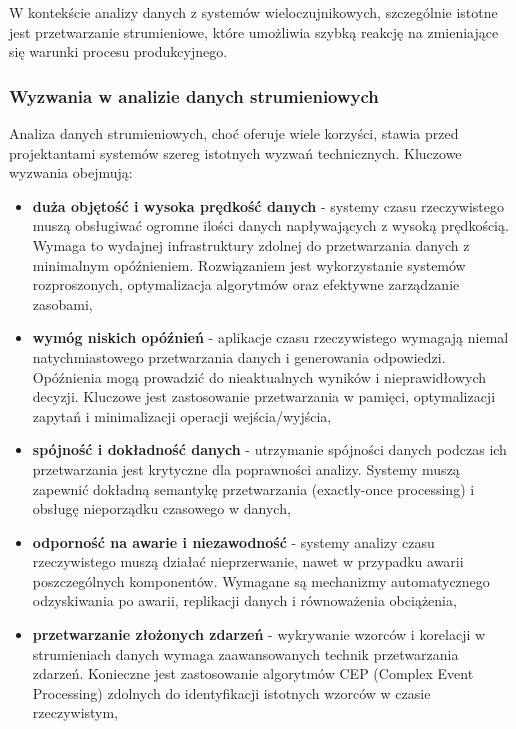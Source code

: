 W kontekście analizy danych z systemów wieloczujnikowych, szczególnie istotne jest przetwarzanie strumieniowe, które umożliwia szybką reakcję na zmieniające się warunki procesu produkcyjnego.

\subsubsection{Wyzwania w analizie danych strumieniowych}
\label{subsubsec:wyzwania_analizy_rt}

Analiza danych strumieniowych, choć oferuje wiele korzyści, stawia przed projektantami systemów szereg istotnych wyzwań technicznych. Kluczowe wyzwania obejmują:

\begin{itemize}
    \item \textbf{duża objętość i wysoka prędkość danych} - systemy czasu rzeczywistego muszą obsługiwać ogromne ilości danych napływających z wysoką prędkością. Wymaga to wydajnej infrastruktury zdolnej do przetwarzania danych z minimalnym opóźnieniem. Rozwiązaniem jest wykorzystanie systemów rozproszonych, optymalizacja algorytmów oraz efektywne zarządzanie zasobami,
    
    \item \textbf{wymóg niskich opóźnień} - aplikacje czasu rzeczywistego wymagają niemal natychmiastowego przetwarzania danych i generowania odpowiedzi. Opóźnienia mogą prowadzić do nieaktualnych wyników i nieprawidłowych decyzji. Kluczowe jest zastosowanie przetwarzania w pamięci, optymalizacji zapytań i minimalizacji operacji wejścia/wyjścia,
    
    \item \textbf{spójność i dokładność danych} - utrzymanie spójności danych podczas ich przetwarzania jest krytyczne dla poprawności analizy. Systemy muszą zapewnić dokładną semantykę przetwarzania (exactly-once processing) i obsługę nieporządku czasowego w danych,
    
    \item \textbf{odporność na awarie i niezawodność} - systemy analizy czasu rzeczywistego muszą działać nieprzerwanie, nawet w przypadku awarii poszczególnych komponentów. Wymagane są mechanizmy automatycznego odzyskiwania po awarii, replikacji danych i równoważenia obciążenia,
    
    \item \textbf{przetwarzanie złożonych zdarzeń} - wykrywanie wzorców i korelacji w strumieniach danych wymaga zaawansowanych technik przetwarzania zdarzeń. Konieczne jest zastosowanie algorytmów CEP (Complex Event Processing) zdolnych do identyfikacji istotnych wzorców w czasie rzeczywistym,
    

\end{itemize}
